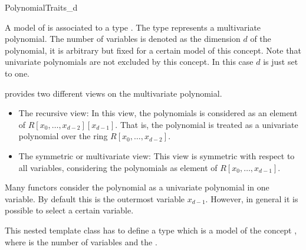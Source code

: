 \begin{ccRefConcept}{PolynomialTraits_d}

\ccDefinition
A model of  is associated to a type 
. 
The type  represents a multivariate polynomial.
The number of variables is denoted as the dimension $d$ of the polynomial,
it is arbitrary but fixed for a certain model of this concept.  
Note that univariate polynomials are not excluded by this concept. In this case 
$d$ is just set to one.  

 provides two different views on the 
multivariate polynomial. 

\begin{itemize}
\item The recursive view:  In this view, the polynomials is considered as 
an element of $R[x_0,\dots,x_{d-2}][x_{d-1}]$. That is, the polynomial 
is treated as a univariate polynomial over the ring $R[x_0,\dots,x_{d-2}]$. 
\item The symmetric or multivariate view: This view is symmetric 
with respect to all variables,
considering the polynomials as element of $R [x_0,\dots,x_{d-1}]$.
\end{itemize}

Many functors consider the polynomial as a univariate polynomial in one variable.
By default this is the outermost variable $x_{d-1}$. However, in general it 
is possible to select a certain variable. 

\ccRefines


\ccConstants
 

\ccTypes

\ccGlue
{}\ccGlue
{}


{This nested template class has to define a type  which is a model 
of the concept , where  is the number of 
variables and  the .}


\end{ccRefConcept}
